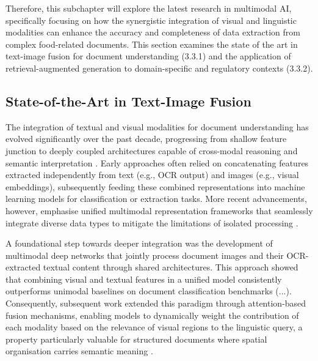 Therefore, this subchapter will explore the latest research in multimodal AI, specifically focusing on how the synergistic integration of visual and linguistic modalities can enhance the accuracy and completeness of data extraction from complex food-related documents. This section examines the state of the art in text-image fusion for document understanding (3.3.1) and the application of retrieval-augmented generation to domain-specific and regulatory contexts (3.3.2).

\hypertarget{state-of-the-art-in-text-image-fusion}{%
\subsection{State-of-the-Art in Text-Image Fusion}\label{state-of-the-art-in-text-image-fusion}}

The integration of textual and visual modalities for document understanding has evolved significantly over the past decade, progressing from shallow feature junction to deeply coupled architectures capable of cross-modal reasoning and semantic interpretation \parencite{shuaishuai_gao_50521934}. Early approaches often relied on concatenating features extracted independently from text (e.g., OCR output) and images (e.g., visual embeddings), subsequently feeding these combined representations into machine learning models for classification or extraction tasks. More recent advancements, however, emphasise unified multimodal representation frameworks that seamlessly integrate diverse data types to mitigate the limitations of isolated processing \parencite{lang_mei_8bcb958f}.

A foundational step towards deeper integration was the development of multimodal deep networks that jointly process document images and their OCR-extracted textual content through shared architectures. This approach showed that combining visual and textual features in a unified model consistently outperforms unimodal baselines on document classification benchmarks (...). Consequently, subsequent work extended this paradigm through attention-based fusion mechanisms, enabling models to dynamically weight the contribution of each modality based on the relevance of visual regions to the linguistic query, a property particularly valuable for structured documents where spatial organisation carries semantic meaning \parencite{paul_pu_liang_8415d006}.

